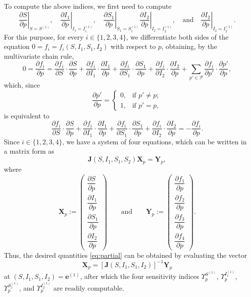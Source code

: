 \documentclass[11pt,reqno]{amsart}
\begin{document}
To compute the above indices, we first need to compute 
\begin{equation}\label{eq:partial}
\left.\dfrac{\partial S}{\partial p}\right|_{S=S^{(1)}},\quad \left.\dfrac{\partial I_1}{\partial p}\right|_{I_1=I_1^{(1)}},\quad \left.\dfrac{\partial S_1}{\partial p}\right|_{S_1=S_1^{(1)}}\left.\dfrac{\partial I_2}{\partial p}\right|_{I_2=I_2^{(1)}},\quad\text{and}\quad \left.\dfrac{\partial I_2}{\partial p}\right|_{I_2=I_2^{(1)}}.
\end{equation}
For this purpose, for every $i\in\{1,2,3,4\}$, we differentiate both sides of the equation $0=f_i=f_i\left(S,I_1,S_1,I_2\right)$ with respect to $p$, obtaining, by the multivariate chain rule,
$$0=\frac{\partial f_i}{\partial p}=\frac{\partial f_i}{\partial S}\cdot\frac{\partial S}{\partial p}+\frac{\partial f_i}{\partial I_1}\cdot\frac{\partial I_1}{\partial p}+\frac{\partial f_i}{\partial S_1}\cdot\frac{\partial S_1}{\partial p}+\frac{\partial f_i}{\partial I_2}\cdot\frac{\partial I_2}{\partial p}+\sum_{p'\in\mathcal{P}}\frac{\partial f_i}{\partial p'}\cdot\frac{\partial p'}{\partial p},$$
which, since
$$\frac{\partial p'}{\partial p}=\begin{cases}
0,&\text{if }p'\neq p;\\
1,&\text{if }p'=p,
\end{cases}$$
is equivalent to
$$\frac{\partial f_i}{\partial S}\cdot\frac{\partial S}{\partial p}+\frac{\partial f_i}{\partial I_1}\cdot\frac{\partial I_1}{\partial p}+\frac{\partial f_i}{\partial S_1}\cdot\frac{\partial S_1}{\partial p}+\frac{\partial f_i}{\partial I_2}\cdot\frac{\partial I_2}{\partial p}=-\frac{\partial f_i}{\partial p}.$$
Since $i\in\{1,2,3,4\}$, we have a system of four equations, which can be written in a matrix form as
$$\mathbf{J}\left(S,I_1,S_1,S_2\right)\mathbf{X}_p=\mathbf{Y}_p,$$
where
$$\mathbf{X}_p:=\left(\begin{array}{c}
 \dfrac{\partial S}{\partial p}\\[0.3cm]
 \dfrac{\partial I_1}{\partial p}\\[0.3cm]
 \dfrac{\partial S_1}{\partial p}\\[0.3cm]
 \dfrac{\partial I_2}{\partial p}
 \end{array}\right)\qquad\text{and}\qquad
 \mathbf{Y}_p:=\left(\begin{array}{c}
 \dfrac{\partial f_1}{\partial p}\\[0.3cm]
 \dfrac{\partial f_2}{\partial p}\\[0.3cm]
 \dfrac{\partial f_3}{\partial p}\\[0.3cm]
 \dfrac{\partial f_4}{\partial p}
 \end{array}\right).$$
Thus, the desired quantities \eqref{eq:partial} can be obtained by evaluating the vector
$$\mathbf{X}_p=\left[\mathbf{J}\left(S,I_1,S_1,I_2\right)\right]^{-1}\mathbf{Y}_p$$
at $\left(S,I_1,S_1,I_2\right)=\mathbf{e}^{(1)}$, after which the four sensitivity indices $\Upsilon^{S^{(1)}}_{p}$, $\Upsilon^{I_1^{(1)}}_{p}$, $\Upsilon^{S_1^{(1)}}_{p}$, and $\Upsilon^{I_2^{(1)}}_{p}$ are readily computable.
\end{document}
